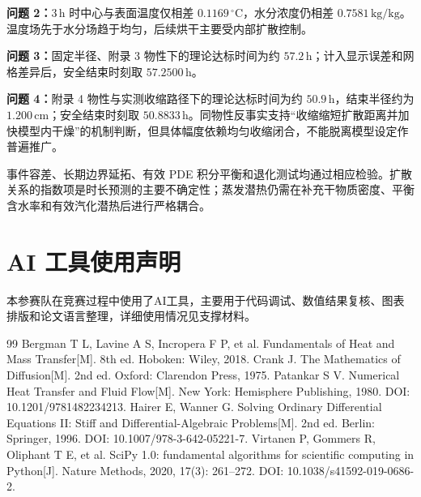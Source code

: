 \documentclass[UTF8,a4paper,zihao=-4,fontset=fandol]{ctexart}
\newcommand{\unit}[1]{\,\mathrm{#1}}
\begin{document}
\textbf{问题 2：}$3\unit{h}$ 时中心与表面温度仅相差 $0.1169\,^{\circ}\mathrm{C}$，水分浓度仍相差 $0.7581\unit{kg/kg}$。温度场先于水分场趋于均匀，后续烘干主要受内部扩散控制。

\textbf{问题 3：}固定半径、附录 3 物性下的理论达标时间为约 $57.2\unit{h}$；计入显示误差和网格差异后，安全结束时刻取 $57.2500\unit{h}$。

\textbf{问题 4：}附录 4 物性与实测收缩路径下的理论达标时间为约 $50.9\unit{h}$，结束半径约为 $1.200\unit{cm}$；安全结束时刻取 $50.8833\unit{h}$。同物性反事实支持“收缩缩短扩散距离并加快模型内干燥”的机制判断，但具体幅度依赖均匀收缩闭合，不能脱离模型设定作普遍推广。

事件容差、长期边界延拓、有效 PDE 积分平衡和退化测试均通过相应检验。扩散关系的指数项是时长预测的主要不确定性；蒸发潜热仍需在补充干物质密度、平衡含水率和有效汽化潜热后进行严格耦合。

\section*{AI 工具使用声明}

本参赛队在竞赛过程中使用了AI工具，主要用于代码调试、数值结果复核、图表排版和论文语言整理，详细使用情况见支撑材料。

\begin{thebibliography}{99}
 Bergman T L, Lavine A S, Incropera F P, et al. Fundamentals of Heat and Mass Transfer[M]. 8th ed. Hoboken: Wiley, 2018.
 Crank J. The Mathematics of Diffusion[M]. 2nd ed. Oxford: Clarendon Press, 1975.
 Patankar S V. Numerical Heat Transfer and Fluid Flow[M]. New York: Hemisphere Publishing, 1980. DOI: 10.1201/9781482234213.
 Hairer E, Wanner G. Solving Ordinary Differential Equations II: Stiff and Differential-Algebraic Problems[M]. 2nd ed. Berlin: Springer, 1996. DOI: 10.1007/978-3-642-05221-7.
 Virtanen P, Gommers R, Oliphant T E, et al. SciPy 1.0: fundamental algorithms for scientific computing in Python[J]. Nature Methods, 2020, 17(3): 261--272. DOI: 10.1038/s41592-019-0686-2.
\end{thebibliography}
\end{document}
